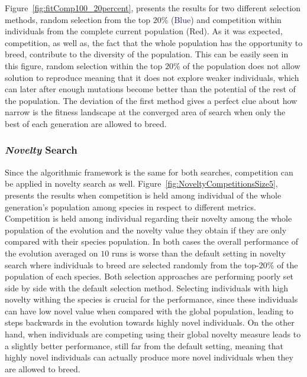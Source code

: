 Figure~\ref{fig:fitComp100_20percent}, presents the results for two different selection methods, random selection from the top $20\%$ (\textcolor{MidnightBlue}{Blue}) and competition within individuals from the complete current population (\textcolor{BrickRed}{Red}). As it was expected, competition, as well as, the fact that the whole population has the opportunity to breed, contribute to the diversity of the population. This can be easily seen in this figure, random selection within the top $20\%$ of the population does not allow solution to reproduce meaning that it does not explore weaker individuals, which can later after enough mutations become better than the potential of the rest of the population. The deviation of the first method gives a perfect clue about how narrow is the fitness landscape at the converged area of search when only the best of each generation are allowed to breed.

\subsubsection*{\emph{Novelty} Search}

Since the algorithmic framework is the same for both searches, competition can be applied in novelty search as well. Figure~\ref{fig:NoveltyCompetitionsSize5}, presents the results when competition is held among individual of the whole generation's population among species in respect to different metrics. Competition is held among individual regarding their novelty among the whole population of the evolution and the novelty value they obtain if they are only compared with their species population. In both cases the overall performance of the evolution averaged on $10$ runs is worse than the default setting in novelty search where individuals to breed are selected randomly from the top-$20\%$ of the population of each species. Both selection approaches are performing poorly set side by side with the default selection method. Selecting individuals with high novelty withing the species is crucial for the performance, since these individuals can have low novel value when compared with the global population, leading to steps backwards in the evolution towards highly novel individuals. On the other hand, when individuals are competing using their global novelty measure leads to a slightly better performance, still far from the default setting, meaning that highly novel individuals can actually produce more novel individuals when they are allowed to breed.



